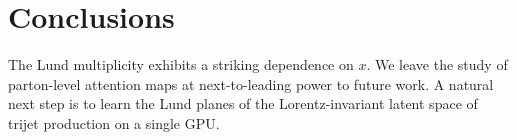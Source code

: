 \section{Conclusions}\label{sec:conclusions}

The Lund multiplicity exhibits a striking dependence on $x$. We leave
the study of parton-level attention maps at next-to-leading power to
future work. A natural next step is to learn the Lund planes of the
Lorentz-invariant latent space of trijet production on a single GPU.

